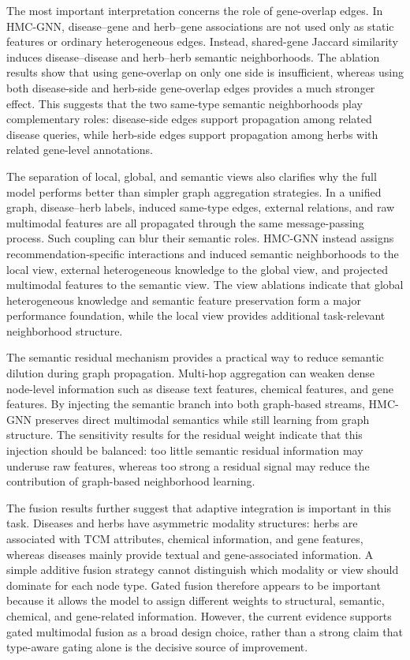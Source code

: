 \documentclass[journal,twoside,web]{ieeecolor}
\begin{document}
The most important interpretation concerns the role of gene-overlap edges. In HMC-GNN, disease--gene and herb--gene associations are not used only as static features or ordinary heterogeneous edges. Instead, shared-gene Jaccard similarity induces disease--disease and herb--herb semantic neighborhoods. The ablation results show that using gene-overlap on only one side is insufficient, whereas using both disease-side and herb-side gene-overlap edges provides a much stronger effect. This suggests that the two same-type semantic neighborhoods play complementary roles: disease-side edges support propagation among related disease queries, while herb-side edges support propagation among herbs with related gene-level annotations.

The separation of local, global, and semantic views also clarifies why the full model performs better than simpler graph aggregation strategies. In a unified graph, disease--herb labels, induced same-type edges, external relations, and raw multimodal features are all propagated through the same message-passing process. Such coupling can blur their semantic roles. HMC-GNN instead assigns recommendation-specific interactions and induced semantic neighborhoods to the local view, external heterogeneous knowledge to the global view, and projected multimodal features to the semantic view. The view ablations indicate that global heterogeneous knowledge and semantic feature preservation form a major performance foundation, while the local view provides additional task-relevant neighborhood structure.

The semantic residual mechanism provides a practical way to reduce semantic dilution during graph propagation. Multi-hop aggregation can weaken dense node-level information such as disease text features, chemical features, and gene features. By injecting the semantic branch into both graph-based streams, HMC-GNN preserves direct multimodal semantics while still learning from graph structure. The sensitivity results for the residual weight indicate that this injection should be balanced: too little semantic residual information may underuse raw features, whereas too strong a residual signal may reduce the contribution of graph-based neighborhood learning.

The fusion results further suggest that adaptive integration is important in this task. Diseases and herbs have asymmetric modality structures: herbs are associated with TCM attributes, chemical information, and gene features, whereas diseases mainly provide textual and gene-associated information. A simple additive fusion strategy cannot distinguish which modality or view should dominate for each node type. Gated fusion therefore appears to be important because it allows the model to assign different weights to structural, semantic, chemical, and gene-related information. However, the current evidence supports gated multimodal fusion as a broad design choice, rather than a strong claim that type-aware gating alone is the decisive source of improvement.
\end{document}
